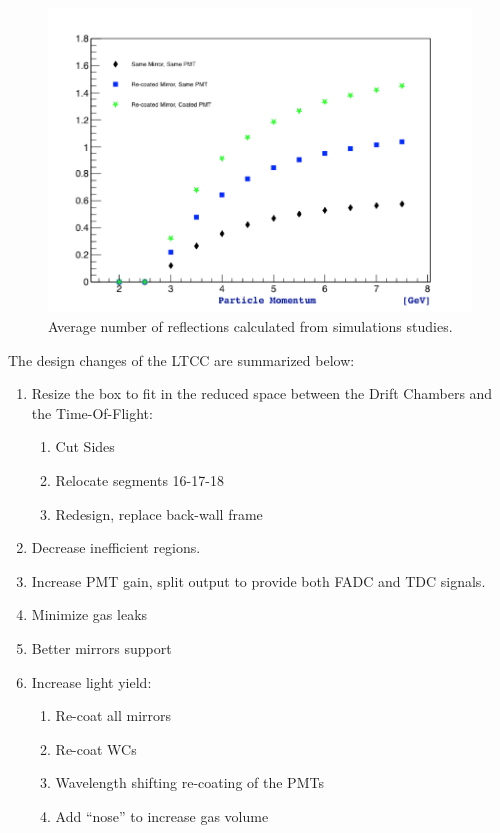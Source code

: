 \begin{figure}[hbt]
	\centering
	\includegraphics[width=1.0\columnwidth,keepaspectratio]{img/refurbishmentGains.png}
	\caption{Average number of reflections calculated from simulations studies.}
	\label{fig:refurbishmentGains}
\end{figure}





The design changes of the LTCC are summarized below:

\begin{enumerate}
\item Resize the box to fit in the reduced space between the Drift Chambers and the Time-Of-Flight:
	\begin{enumerate}
		\item Cut Sides
		\item Relocate segments 16-17-18
		\item Redesign, replace back-wall frame
	\end{enumerate}

	\item Decrease inefficient regions.
	\item Increase PMT gain, split output to provide both FADC and TDC signals.
	\item Minimize gas leaks
	\item Better mirrors support
	\item Increase light yield:
	\begin{enumerate}
		\item Re-coat all mirrors
		\item Re-coat WCs
		\item Wavelength shifting re-coating of the PMTs
		\item Add “nose” to increase gas volume
	\end{enumerate}
\end{enumerate}






